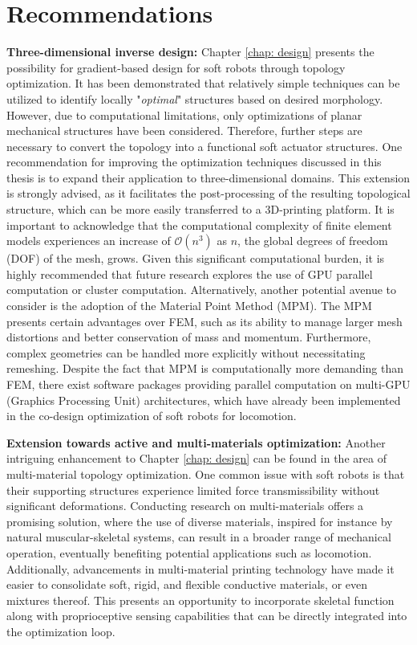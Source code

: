\section[Recommendations]{Recommendations}
\textbf{Three-dimensional inverse design:}  Chapter \ref{chap: design} presents the possibility for gradient-based design for soft robots through topology optimization. It has been demonstrated that relatively simple techniques can be utilized to identify locally "\textit{optimal}" structures based on desired morphology. However, due to computational limitations, only optimizations of planar mechanical structures have been considered. Therefore, further steps are necessary to convert the topology into a functional soft actuator structures. One recommendation for improving the optimization techniques discussed in this thesis is to expand their application to three-dimensional domains. This extension is strongly advised, as it facilitates the post-processing of the resulting topological structure, which can be more easily transferred to a 3D-printing platform. It is important to acknowledge that the computational complexity of finite element models experiences an increase of $\mathcal{O}(n^3)$ as $n$, the global degrees of freedom (DOF) of the mesh, grows. Given this significant computational burden, it is highly recommended that future research explores the use of GPU parallel computation or cluster computation. Alternatively, another potential avenue to consider is the adoption of the Material Point Method (MPM). The MPM presents certain advantages over FEM, such as its ability to manage larger mesh distortions and better conservation of mass and momentum. Furthermore, complex geometries can be handled more explicitly without necessitating remeshing. Despite the fact that MPM is computationally more demanding than FEM, there exist software packages providing parallel computation on multi-GPU (Graphics Processing Unit) architectures, which have already been implemented in the co-design optimization of soft robots for locomotion. 

\textbf{Extension towards active and multi-materials optimization:} Another intriguing enhancement to Chapter \ref{chap: design} can be found in the area of multi-material topology optimization. One common issue with soft robots is that their supporting structures experience limited force transmissibility without significant deformations. Conducting research on multi-materials offers a promising solution, where the use of diverse materials, inspired for instance by natural muscular-skeletal systems, can result in a broader range of mechanical operation, eventually benefiting potential applications such as locomotion. Additionally, advancements in multi-material printing technology have made it easier to consolidate soft, rigid, and flexible conductive materials, or even mixtures thereof. This presents an opportunity to incorporate skeletal function along with proprioceptive sensing capabilities that can be directly integrated into the optimization loop.

